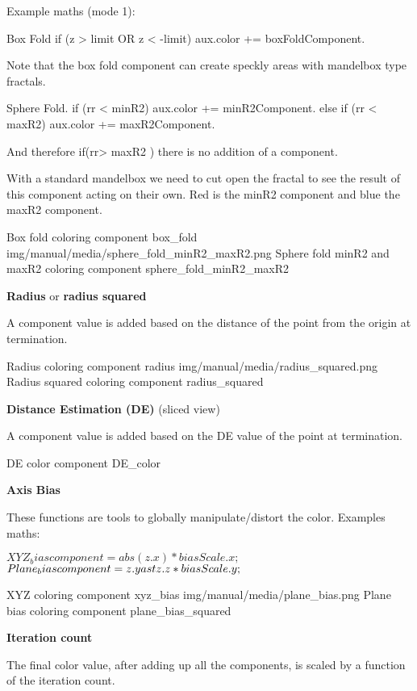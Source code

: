 Example  maths (mode 1):

Box Fold
if  (z  >  limit  OR  z  <   -limit)   aux.color +=  boxFoldComponent.

Note that the box fold component can create  speckly areas with mandelbox type fractals.

Sphere Fold. 
if (rr < minR2)    aux.color +=  minR2Component.
else if (rr < maxR2)    aux.color +=  maxR2Component.

And therefore  if(rr> maxR2 ) there is no addition of a component.

With a standard mandelbox we need to cut open the fractal to see the result of this component acting on their own. Red is the minR2 component and blue the maxR2 component.


{Box fold coloring component}
{box_fold}
{img/manual/media/sphere_fold_minR2_maxR2.png}
{Sphere fold minR2 and maxR2 coloring component}
{sphere_fold_minR2_maxR2}


\textbf{Radius} or \textbf{radius squared} 

A  component value is added based on the distance of the point from the origin at termination.


{Radius coloring component}
{radius}
{img/manual/media/radius_squared.png}
{Radius squared coloring component}
{radius_squared}

\textbf{Distance Estimation (DE)}  (sliced view)

A  component value is added based on the DE value of the point at termination.

{DE color component}
{DE_color}

\textbf{Axis Bias}

These functions are tools to globally manipulate/distort the color. 
Examples maths:

$XYZ_bias                component = abs(z.x) \ast biasScale.x;$
$Plane_bias              component = z.y \\ast z.z \ast biasScale.y;$

{XYZ coloring component}
{xyz_bias}
{img/manual/media/plane_bias.png}
{Plane bias coloring component}
{plane_bias_squared}

\textbf{Iteration count}

The final color value, after adding up all the components, is  scaled by a function of the iteration count.

